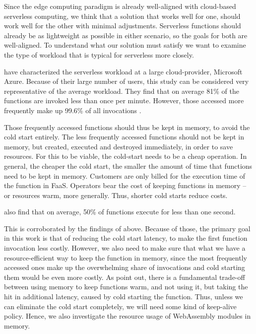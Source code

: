 Since the edge computing paradigm is already well-aligned with cloud-based serverless computing, we think that a solution that works well for one, should work well for the other with minimal adjustments. Serverless functions should already be as lightweight as possible in either scenario, so the goals for both are well-aligned.
To understand what our solution must satisfy we want to examine the type of workload that is typical for serverless more closely.

\citeauthor{Shahrad2020} have characterized the serverless workload at a large cloud-provider, Microsoft Azure. Because of their large number of users, this study can be considered very representative of the average workload.
They find that on average 81\% of the functions are invoked less than once per minute. However, those accessed more frequently make up 99.6\% of all invocations \cite{Shahrad2020}.

Those frequently accessed functions should thus be kept in memory, to avoid the cold start entirely. The less frequently accessed functions should not be kept in memory, but created, executed and destroyed immediately, in order to save resources. For this to be viable, the cold-start needs to be a cheap operation. In general, the cheaper the cold start, the smaller the amount of time that functions need to be kept in memory.
Customers are only billed for the execution time of the function in FaaS. Operators bear the cost of keeping functions in memory -- or resources warm, more generally. Thus, shorter cold starts reduce costs.

\citeauthor{Shahrad2020} also find that on average, 50\% of functions execute for less than one second.

\begin{quote}
\end{quote}

This is corroborated by the findings of \citeauthor{Wang2018} above.
Because of those, the primary goal in this work is that of reducing the cold start latency, to make the first function invocation less costly. However, we also need to make sure that what we have a resource-efficient way to keep the function in memory, since the most frequently accessed ones make up the overwhelming share of invocations and cold starting them would be even more costly.
As \citeauthor{Shahrad2020} point out, there is a fundamental trade-off between using memory to keep functions warm, and not using it, but taking the hit in additional latency, caused by cold starting the function. Thus, unless we can eliminate the cold start completely, we will need some kind of keep-alive policy. Hence, we also investigate the resource usage of WebAssembly modules in memory.

